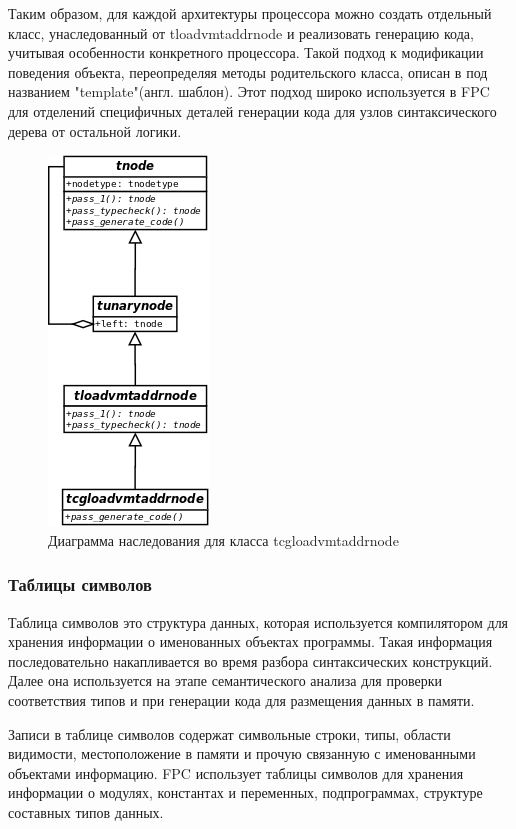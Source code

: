 \documentclass{imcs}
\begin{document}
Таким образом, для каждой архитектуры процессора можно создать отдельный класс, 
унаследованный от tloadvmtaddrnode и реализовать генерацию кода, 
учитывая особенности конкретного процессора.
Такой подход к модификации поведения объекта, переопределяя методы родительского класса,
описан в \cite{gof} под названием "template"(англ. шаблон). Этот подход широко
используется в FPC для отделений специфичных деталей генерации кода для узлов синтаксического
дерева от остальной логики.

\begin{figure}[htb]
\centering
\includegraphics{./uml/cgnodeexample.png}
\caption{Диаграмма наследования для класса tcgloadvmtaddrnode}
\label{tcgloadvmtaddrnode}
\end{figure}

\pagebreak

\subsubsection{Таблицы символов}

Таблица символов это структура данных, которая используется компилятором для хранения 
информации о именованных объектах программы. Такая информация последовательно накапливается во время
разбора синтаксических конструкций. Далее она используется на этапе семантического анализа 
для проверки соответствия типов и при генерации кода для размещения данных в памяти.

Записи в таблице символов содержат символьные строки, типы, области видимости, 
местоположение в памяти и прочую связанную с именованными объектами информацию.
FPC использует таблицы символов для хранения информации о модулях,
константах и переменных, подпрограммах, структуре составных типов данных.
\end{document}
